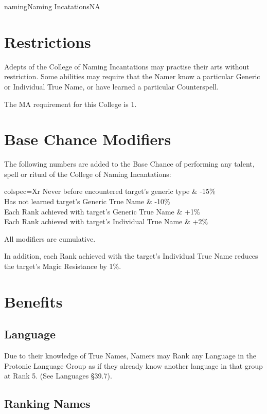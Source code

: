 \begin{College}[2.0]{naming}{Naming Incatations}{NA}
\section{Restrictions}

Adepts of the College of Naming Incantations may practise their arts
without restriction.  Some abilities may require that the Namer know a
particular Generic or Individual True Name, or have learned a
particular Counterspell.

The MA requirement for this College is 1. 


\section{Base Chance Modifiers}

The following numbers are added to the Base Chance of performing any
talent, spell or ritual of the College of Naming Incantations:

\begin{dqtblr}{colspec={Xr}}
Never before encountered target’s generic type		& -15\% \\
Has not learned target’s Generic True Name		& -10\% \\
Each Rank achieved with target’s Generic True Name	& +1\% \\
Each Rank achieved with target’s Individual True Name 	& +2\% \\
\end{dqtblr}

All modifiers are cumulative. 

In addition, each Rank achieved with the target’s Individual True Name
reduces the target’s Magic Resistance by 1\%.

\section{Benefits}

\subsection{Language}

Due to their knowledge of True Names, Namers may Rank any Language in
the Protonic Language Group as if they already know another language
in that group at Rank 5. (See Languages §39.7).

\subsection{Ranking Names}


\end{College}
